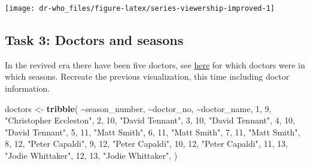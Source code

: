 \documentclass[
]{article}
\newenvironment{Shaded}{\begin{snugshade}}{\end{snugshade}}
\newcommand{\DecValTok}[1]{\textcolor[rgb]{0.00,0.00,0.81}{#1}}
\newcommand{\FunctionTok}[1]{\textcolor[rgb]{0.13,0.29,0.53}{\textbf{#1}}}
\newcommand{\NormalTok}[1]{#1}
\newcommand{\OtherTok}[1]{\textcolor[rgb]{0.56,0.35,0.01}{#1}}
\newcommand{\SpecialCharTok}[1]{\textcolor[rgb]{0.81,0.36,0.00}{\textbf{#1}}}
\newcommand{\StringTok}[1]{\textcolor[rgb]{0.31,0.60,0.02}{#1}}
\begin{document}
\texttt{[image: dr-who\_files/figure-latex/series-viewership-improved-1]}

\hypertarget{task-3-doctors-and-seasons}{%
\subsection{Task 3: Doctors and
seasons}\label{task-3-doctors-and-seasons}}

In the revived era there have been five doctors, see
\href{https://en.wikipedia.org/wiki/List_of_Doctor_Who_episodes_(2005\%E2\%80\%93present)\#Regular_seasons}{here}
for which doctors were in which seasons. Recreate the previous
visualization, this time including doctor information.

\begin{Shaded}
\begin{Highlighting}[]
\NormalTok{doctors }\OtherTok{\textless{}{-}} \FunctionTok{tribble}\NormalTok{(}
  \SpecialCharTok{\textasciitilde{}}\NormalTok{season\_number, }\SpecialCharTok{\textasciitilde{}}\NormalTok{doctor\_no, }\SpecialCharTok{\textasciitilde{}}\NormalTok{doctor\_name,}
               \DecValTok{1}\NormalTok{,          }\DecValTok{9}\NormalTok{, }\StringTok{"Christopher Eccleston"}\NormalTok{,}
               \DecValTok{2}\NormalTok{,         }\DecValTok{10}\NormalTok{, }\StringTok{"David Tennant"}\NormalTok{,}
               \DecValTok{3}\NormalTok{,         }\DecValTok{10}\NormalTok{, }\StringTok{"David Tennant"}\NormalTok{,}
               \DecValTok{4}\NormalTok{,         }\DecValTok{10}\NormalTok{, }\StringTok{"David Tennant"}\NormalTok{,}
               \DecValTok{5}\NormalTok{,         }\DecValTok{11}\NormalTok{, }\StringTok{"Matt Smith"}\NormalTok{,}
               \DecValTok{6}\NormalTok{,         }\DecValTok{11}\NormalTok{, }\StringTok{"Matt Smith"}\NormalTok{,}
               \DecValTok{7}\NormalTok{,         }\DecValTok{11}\NormalTok{, }\StringTok{"Matt Smith"}\NormalTok{,}
               \DecValTok{8}\NormalTok{,         }\DecValTok{12}\NormalTok{, }\StringTok{"Peter Capaldi"}\NormalTok{,}
               \DecValTok{9}\NormalTok{,         }\DecValTok{12}\NormalTok{, }\StringTok{"Peter Capaldi"}\NormalTok{,}
              \DecValTok{10}\NormalTok{,         }\DecValTok{12}\NormalTok{, }\StringTok{"Peter Capaldi"}\NormalTok{,}
              \DecValTok{11}\NormalTok{,         }\DecValTok{13}\NormalTok{, }\StringTok{"Jodie Whittaker"}\NormalTok{,}
              \DecValTok{12}\NormalTok{,         }\DecValTok{13}\NormalTok{, }\StringTok{"Jodie Whittaker"}\NormalTok{,}
\NormalTok{)}
\end{Highlighting}
\end{Shaded}
\end{document}
